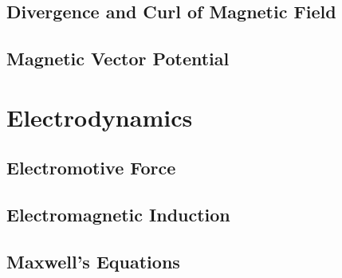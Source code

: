\documentclass[12pt,a4paper,twoside]{article}
\begin{document}
\subsection{Divergence and Curl of Magnetic Field}
\subsection{Magnetic Vector Potential}
\section{Electrodynamics}
\subsection{Electromotive Force}
\subsection{Electromagnetic Induction}
\subsection{Maxwell's Equations}
\end{document}
